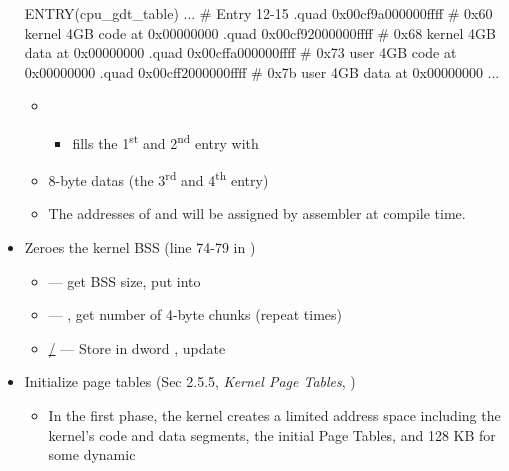 \begin{itemize}
\begin{gascode}
ENTRY(cpu_gdt_table)
        ...
        # Entry 12-15 
        .quad 0x00cf9a000000ffff    # 0x60 kernel 4GB code at 0x00000000 
        .quad 0x00cf92000000ffff    # 0x68 kernel 4GB data at 0x00000000 
        .quad 0x00cffa000000ffff    # 0x73 user 4GB code at 0x00000000 
        .quad 0x00cff2000000ffff    # 0x7b user 4GB data at 0x00000000 
        ...
      \end{gascode}
    \begin{itemize}
    \item {}
      \begin{itemize}
      \item {} fills the 1\textsuperscript{st} and 2\textsuperscript{nd}
        entry with 
      \end{itemize}
    \item {} 8-byte datas (the 3\textsuperscript{rd} and 4\textsuperscript{th}
      entry)
    \item The addresses of  and  will be
      assigned by assembler at compile time.
    \end{itemize}
  \item Zeroes the kernel BSS (line 74-79 in )
    \begin{itemize}
    \item {} --- get BSS size, put into 
    \item {} --- , get number of 4-byte chunks
      (repeat times)
    \item
      \href{http://pdos.csail.mit.edu/6.828/2004/readings/i386/STOS.htm}{/}
      --- Store  in dword , update 
    \end{itemize}
\item Initialize page tables (Sec 2.5.5, \emph{Kernel Page Tables}, \cite{bovet2005understanding})
  \begin{itemize}
  \item In the first phase, the kernel creates a limited address space including the
    kernel's code and data segments, the initial Page Tables, and 128 KB for some dynamic

\end{itemize}
\end{itemize}
